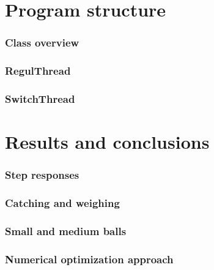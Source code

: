 \documentclass[
compress]
{beamer}
\begin{document}
\section{Program structure}
\begin{frame}
\frametitle{Class overview}

\end{frame}

\begin{frame}
\frametitle{RegulThread}

\end{frame}

\begin{frame}
\frametitle{SwitchThread}

\end{frame}

\section{Results and conclusions}
\begin{frame}
\frametitle{Step responses}

\end{frame}

\begin{frame}
\frametitle{Catching and weighing}

\end{frame}

\begin{frame}
\frametitle{Small and medium balls}

\end{frame}

\begin{frame}
\frametitle{Numerical optimization approach}

\end{frame}
\end{document}
